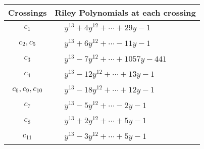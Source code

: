 \documentclass[1p]{elsarticle_modified}
\theoremstyle{definition}
\begin{document}
\begin{tabular}{m{50pt}|m{274pt}}
Crossings & \hspace{64pt}Riley Polynomials at each crossing \\
\hline $$\begin{aligned}c_{1}\end{aligned}$$&$\begin{aligned}
&y^{13}+4 y^{12}+\cdots+29 y-1
\end{aligned}$\\
\hline $$\begin{aligned}c_{2},c_{5}\end{aligned}$$&$\begin{aligned}
&y^{13}+6 y^{12}+\cdots-11 y-1
\end{aligned}$\\
\hline $$\begin{aligned}c_{3}\end{aligned}$$&$\begin{aligned}
&y^{13}-7 y^{12}+\cdots+1057 y-441
\end{aligned}$\\
\hline $$\begin{aligned}c_{4}\end{aligned}$$&$\begin{aligned}
&y^{13}-12 y^{12}+\cdots+13 y-1
\end{aligned}$\\
\hline $$\begin{aligned}c_{6},c_{9},c_{10}\end{aligned}$$&$\begin{aligned}
&y^{13}-18 y^{12}+\cdots+12 y-1
\end{aligned}$\\
\hline $$\begin{aligned}c_{7}\end{aligned}$$&$\begin{aligned}
&y^{13}-5 y^{12}+\cdots-2 y-1
\end{aligned}$\\
\hline $$\begin{aligned}c_{8}\end{aligned}$$&$\begin{aligned}
&y^{13}+2 y^{12}+\cdots+5 y-1
\end{aligned}$\\
\hline $$\begin{aligned}c_{11}\end{aligned}$$&$\begin{aligned}
&y^{13}-3 y^{12}+\cdots+5 y-1
\end{aligned}$\\
\hline
\end{tabular}\\~\\
\end{document}
